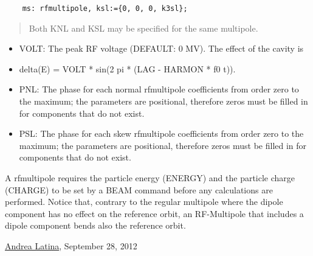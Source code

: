 \begin{verbatim}
	ms: rfmultipole, ksl:={0, 0, 0, k3sl};\end{verbatim}
\begin{quotation}Both KNL and KSL may be specified for the same         multipole. 
\end{quotation}
\begin{itemize}
	\item VOLT: The peak RF voltage (DEFAULT: 0 MV). The effect of the           cavity is 
	\item delta(E) = VOLT * sin(2 pi * (LAG - HARMON * f0 t)). 
	\item PNL: The phase for each normal rfmultipole coefficients from           order zero to the maximum; the parameters are positional,           therefore zeros must be filled in for components that do not           exist. 
	\item PSL: The phase for each skew rfmultipole coefficients from           order zero to the maximum; the parameters are positional,           therefore zeros must be filled in for components that do not           exist. 
\end{itemize}       A rfmultipole requires the particle energy (ENERGY) and the       particle charge (CHARGE) to be set by a BEAM command before any       calculations are performed. Notice that, contrary to the regular       multipole where the dipole component has no effect on the       reference orbit, an RF-Multipole that includes a dipole component       bends also the reference orbit.     


\href{https://phonebook.cern.ch/foundpub/Phonebook/index.html?search=latina#id=PE525753}{Andrea         Latina}, September 28, 2012 


